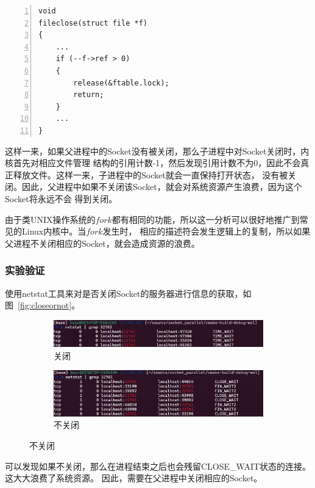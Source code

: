 \documentclass[a4paper,twoside]{article}
\begin{document}
\begin{spacing}{1.2}
\begin{lstlisting}[numbers=left,style=CppStyle,caption={$fileclose$函数的实现},label={code:fileclose}]
void
fileclose(struct file *f)
{
	... 
	if (--f->ref > 0)
	{
		release(&ftable.lock);
		return;
	}
	...
}
\end{lstlisting}

这样一来，如果父进程中的Socket没有被关闭，那么子进程中对Socket关闭时，内核首先对相应文件管理
结构的引用计数-1，然后发现引用计数不为0，因此不会真正释放文件。这样一来，子进程中的Socket就会一直保持打开状态，
没有被关闭。因此，父进程中如果不关闭该Socket，就会对系统资源产生浪费，因为这个Socket将永远不会
得到关闭。

由于类UNIX操作系统的$fork$都有相同的功能，所以这一分析可以很好地推广到常见的Linux内核中。当$fork$发生时，
相应的描述符会发生逻辑上的复制，所以如果父进程不关闭相应的Socket，就会造成资源的浪费。

\subsubsection{实验验证}

使用netstat工具来对是否关闭Socket的服务器进行信息的获取，如图~\ref{fig:closeornot}。

\begin{figure}[htbp]
	\centering
	\caption{是否关闭}
	\label{fig:acc}
	\begin{subfigure}{0.4\textwidth}
		\centering
		\includegraphics[width=\textwidth]{close.png}
		\caption{关闭}
		\label{fig:close}
	\end{subfigure}
	\begin{subfigure}{0.4\textwidth}
		\centering
		\includegraphics[width=\textwidth]{noclose.png}
		\caption{不关闭}
		\label{fig:noclose}
	\end{subfigure}
\end{figure}

可以发现如果不关闭，那么在进程结束之后也会残留CLOSE\_WAIT状态的连接。这大大浪费了系统资源。
因此，需要在父进程中关闭相应的Socket。


\end{spacing}
\end{document}
